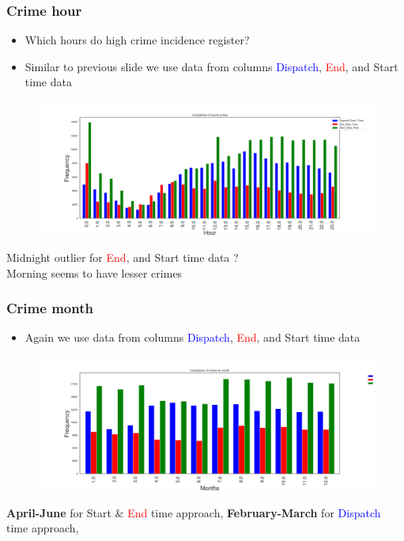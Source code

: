 \documentclass[usenames,dvipsnames]{beamer}
\begin{document}
\begin{frame}
\frametitle{Crime hour}
\begin{itemize}
\item Which hours do high crime incidence register? 
\item Similar to previous slide we use data from columns \textcolor{blue}{Dispatch},  \textcolor{red}{End}, and  \textcolor{OliveGreen}{Start} time data 
\end{itemize}
\graphicspath{{Figures//}}
\vspace{-0.5cm}
\begin{figure}[htbp]
\centering
\includegraphics[width= 4.0 in]{crime_hour}
\label{crimehour}
\end{figure}
Midnight outlier  for  \textcolor{red}{End}, and  \textcolor{OliveGreen}{Start} time data ?\\
Morning seems to have lesser crimes

\end{frame}
\begin{frame}
\frametitle{Crime month}
\begin{itemize}
\item Again we use data from columns \textcolor{blue}{Dispatch},  \textcolor{red}{End}, and  \textcolor{OliveGreen}{Start} time data 
\end{itemize}
\graphicspath{{Figures//}}
\vspace{-0.5cm}
\begin{figure}[htbp]
\centering
\includegraphics[width= 4.0 in]{crime_month}
\label{crimemonthr}
\end{figure}
\textbf{April-June} for \textcolor{OliveGreen}{Start} \& \textcolor{red}{End} time approach, 
\textbf{February-March} for \textcolor{blue}{Dispatch} time approach, 
\end{frame}
\end{document}
